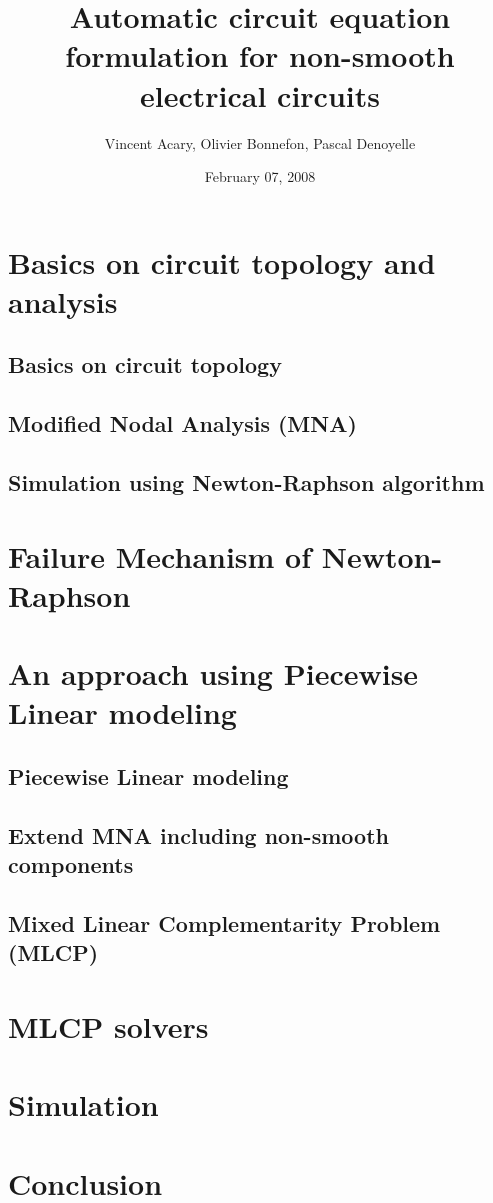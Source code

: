 \documentclass[8pt,xcolor*pst]{beamer}
\title{Automatic circuit equation formulation for non-smooth electrical circuits}
\author{Vincent Acary, Olivier Bonnefon, Pascal Denoyelle}
\date{February 07, 2008}
\institute{INRIA Rh\^one-Alpes}
\begin{document}
\frame{\titlepage}
\frame{\tableofcontents}%
\section{Basics on circuit topology and analysis}
\subsection{Basics on circuit topology}

\subsection{Modified Nodal Analysis (MNA)}

\subsection{Simulation using Newton-Raphson algorithm}

\section{Failure Mechanism of Newton-Raphson}

\section{An approach using Piecewise Linear modeling}
\subsection{Piecewise Linear modeling}

\subsection{Extend MNA including non-smooth components}

\subsection{Mixed Linear Complementarity Problem (MLCP)}

\section{MLCP solvers}



\section{Simulation}

\section{Conclusion}



\def\newblock{}
\end{document}
